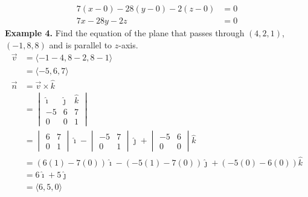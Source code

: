 \begin{align*}
    7(x - 0) - 28(y - 0) - 2(z - 0) & = 0 \\
    7x - 28y - 2z                   & = 0
\end{align*}
\newpage
\noindent\textbf{Example 4. } Find the equation of the plane that passes through $(4, 2, 1)$, $(-1, 8, 8)$ and is parallel to $z$-axis.
\begin{align*}
    \vec{v} & = \langle -1 - 4, 8 - 2, 8 - 1 \rangle                                           \\
            & = \langle -5, 6, 7 \rangle                                                       \\
    \vec{n} & = \vec{v} \times \hat{k}                                                         \\
            & = \begin{vmatrix}
                    \hat{\imath} & \hat{\jmath} & \hat{k} \\
                    -5           & 6            & 7       \\
                    0            & 0            & 1
                \end{vmatrix}                      \\
            & = \begin{vmatrix}
                    6 & 7 \\
                    0 & 1
                \end{vmatrix}\hat{\imath} - \begin{vmatrix}
                                                -5 & 7 \\
                                                0  & 1
                                            \end{vmatrix}\hat{\jmath} + \begin{vmatrix}
                                                                            -5 & 6 \\
                                                                            0  & 0
                                                                        \end{vmatrix}\hat{k}   \\
            & = (6(1) - 7(0))\hat{\imath} - (-5(1) - 7(0))\hat{\jmath} + (-5(0) - 6(0))\hat{k} \\
            & = 6\hat{\imath} + 5\hat{\jmath}                                                  \\
            & = \langle 6, 5, 0 \rangle
\end{align*}
